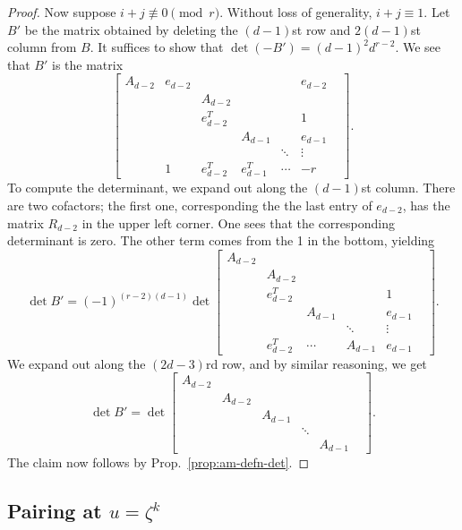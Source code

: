 \documentclass[reqno]{amsart}
\theoremstyle{definition}
\theoremstyle{remark}
\begin{document}
\begin{proof}
Now suppose $i+j \not\equiv 0 \pmod{r}$. Without loss of generality, $i + j \equiv 1$. Let $B'$ be the matrix obtained by deleting the $(d-1)$st row and $2(d-1)$st column from $B$. It suffices to show that $\det (-B') = (d-1)^2d^{r-2}$. We see that $B'$ is the matrix
\[
\left[\begin{array}{ccccccc}
  A_{d-2} & e_{d-2} & & & & e_{d-2} \\
  & & A_{d-2} & & & & \\
  & & e_{d-2}^T & & & 1 \\
  & & & A_{d-1} & & e_{d-1} \\
  & & & & \ddots & \vdots \\
  & 1 & e_{d-2}^T & e_{d-1}^T & \cdots & -r
\end{array}\right].
\]
To compute the determinant, we expand out along the $(d-1)$st column. There are two cofactors; the first one, corresponding the the last entry of $e_{d-2}$, has the matrix $R_{d-2}$ in the upper left corner. One sees that the corresponding determinant is zero. The other term comes from the 1 in the bottom, yielding
\[
\det B' = (-1)^{(r-2)(d-1)}\det \left[
  \begin{array}{cccccc}
  A_{d-2} & & & & & \\
  & A_{d-2} & & & & \\
  & e_{d-2}^T & & & 1 \\
  & & A_{d-1} & & e_{d-1} \\
  & & & \ddots & \vdots \\
  & e_{d-2}^T & \cdots & A_{d-1} & e_{d-1}
  \end{array}\right].
\]
We expand out along the $(2d-3)$rd row, and by similar reasoning, we get
\[
\det B' = \det \left[
  \begin{array}{cccccc}
  A_{d-2} & & & & & \\
  & A_{d-2} & & & & \\
  & & A_{d-1} & & \\
  & & & \ddots &  \\
  & & & & A_{d-1}
  \end{array}\right].
\]
The claim now follows by Prop.~\ref{prop:am-defn-det}.
\end{proof}

\subsection{Pairing at $u = \zeta^k$}
\label{sec:pairing-at-u-1}
\end{document}
